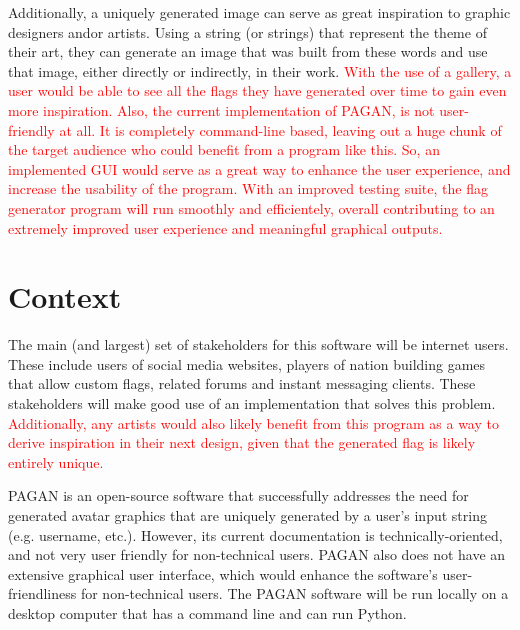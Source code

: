 \documentclass[12pt, letterpaper]{article}
\begin{document}
Additionally, a uniquely generated image can serve as great inspiration to graphic designers and\/or artists. Using a string (or strings) that represent the theme of their art, they can generate an image that was built from these words and use that image, either directly or indirectly, in their work. \textcolor{red}{With the use of a gallery, a user would be able to see all the flags they have generated over time to gain even more inspiration.}
\textcolor{red}{Also, the current implementation of PAGAN, is not user-friendly at all. It is completely command-line based, leaving out a huge chunk of the target audience who could benefit from a program like this. So, an implemented GUI would serve as a great way to enhance the user experience, and increase the usability of the program. With an improved testing suite, the flag generator program will run smoothly and efficientely, overall contributing to an extremely improved user experience and meaningful graphical outputs.}

\section{Context}
The main (and largest) set of stakeholders for this software will be internet users. These include users of social media websites, players of nation building games that allow custom flags, related forums and instant messaging clients. These stakeholders will make good use of an implementation that solves this problem. \textcolor{red}{Additionally, any artists would also likely benefit from this program as a way to derive inspiration in their next design, given that the generated flag is likely entirely unique.}

PAGAN is an open-source software that successfully addresses the need for generated avatar graphics that are uniquely generated by a user’s input string (e.g. username, etc.). However, its current documentation is technically-oriented, and not very user friendly for non-technical users. PAGAN also does not have an extensive graphical user interface, which would enhance the software's user-friendliness for non-technical users. The PAGAN software will be run locally on a desktop computer that has a command line and can run Python.
\end{document}

